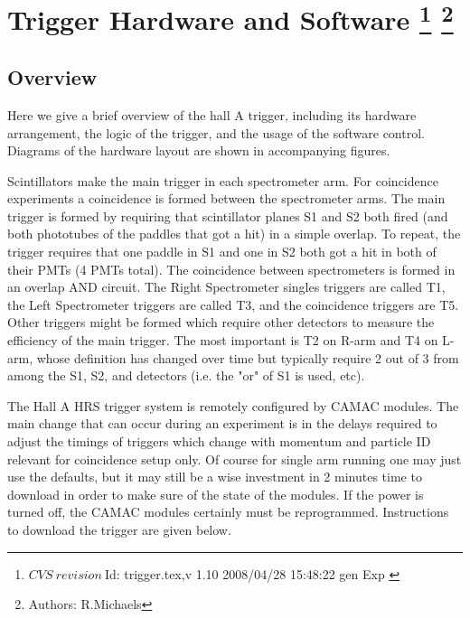 \chapter[Trigger Hardware and Software]{Trigger Hardware and Software
\footnote{
  $CVS~revision~ $Id: trigger.tex,v 1.10 2008/04/28 15:48:22 gen Exp $ $
}
\footnote{Authors: R.Michaels }
}

\section{Overview}
\par
Here we give a brief overview of the 
hall A trigger, including its hardware arrangement,
the logic of the trigger, and the usage
of the software control.
Diagrams of the hardware layout are shown in
accompanying figures.

\par

Scintillators make the main trigger 
in each spectrometer arm. For coincidence experiments a 
coincidence is formed between the spectrometer arms.   
The main trigger is formed by requiring that scintillator 
planes S1 and S2 both fired (and both phototubes of the 
paddles that got a hit) in a simple overlap. To repeat, 
the trigger requires that one paddle in S1 and one in 
S2 both got a hit in both of their PMTs (4 PMTs total).  
The coincidence between spectrometers is formed in an 
overlap AND circuit.  The Right Spectrometer singles 
triggers are called T1, the Left Spectrometer triggers 
are called T3, and the coincidence triggers are T5.   
Other triggers might be formed which require other detectors 
to measure the efficiency of the main trigger. The most 
important is T2 on R-arm and T4 on L-arm, whose definition 
has changed over time but typically require 2 out of 3 
from among the S1, S2, and \Cherenkov{} detectors (i.e. the 
"or" of S1 is used, etc).

The Hall A HRS trigger system is remotely configured by 
CAMAC modules.   The main change that can occur during 
an experiment is in the delays required to adjust the 
timings of triggers which change with momentum and 
particle ID relevant for coincidence setup only.   
Of course for single arm running one may just use the 
defaults, but it may still be a wise investment in 2 
minutes time to download in order to make sure of 
the state of the modules.   If the power is turned off, 
the CAMAC modules certainly must be reprogrammed. 
Instructions to download the trigger are given below.

